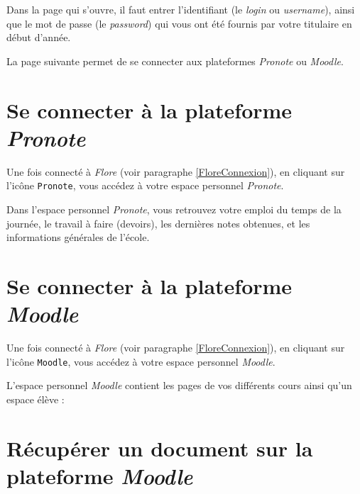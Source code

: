 Dans la page qui s'ouvre, il faut entrer l'identifiant (le \emph{login} ou \emph{username}), ainsi que le mot de passe (le \emph{password}) qui vous ont été fournis par votre titulaire en début d'année.



La page suivante permet de se connecter aux plateformes \emph{Pronote} ou \emph{Moodle}.



\section{Se connecter à la plateforme \emph{Pronote}}

Une fois connecté à \emph{Flore} (voir paragraphe \vref{FloreConnexion}), en cliquant sur l'icône \texttt{Pronote}, vous accédez à votre espace personnel \emph{Pronote}.


Dans l'espace personnel \emph{Pronote}, vous retrouvez votre emploi du temps de la journée, le travail à faire (devoirs), les dernières notes obtenues, et les informations générales de l'école.










\section{Se connecter à la plateforme \emph{Moodle}}

Une fois connecté à \emph{Flore} (voir paragraphe \vref{FloreConnexion}), en cliquant sur l'icône \texttt{Moodle}, vous accédez à votre espace personnel \emph{Moodle}.


L'espace personnel \emph{Moodle} contient les pages de vos différents cours ainsi qu'un espace élève :







\section{Récupérer un document sur la plateforme \emph{Moodle}}\label{MoodlePrendreDoc}

